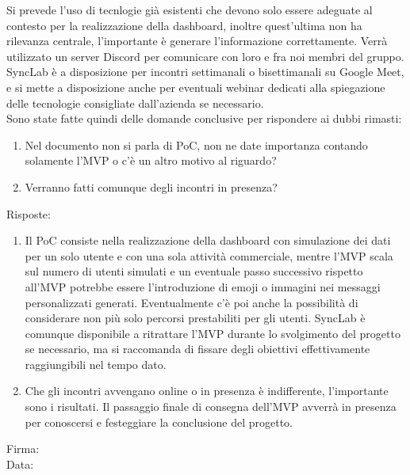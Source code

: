 \documentclass[12pt]{article}
\begin{document}
Si prevede l'uso di tecnlogie già esistenti che devono solo essere adeguate al contesto per la realizzazione della dashboard, inoltre quest'ultima non ha rilevanza centrale, l'importante è generare l'informazione correttamente.\newline
Verrà utilizzato un server Discord per comunicare con loro e fra noi membri del gruppo.\newline 
SyncLab è a disposizione per incontri settimanali o bisettimanali su Google Meet, e si mette a disposizione anche per eventuali webinar dedicati alla spiegazione delle tecnologie consigliate dall'azienda se necessario.\\
\vspace{2mm}
Sono state fatte quindi delle domande conclusive per rispondere ai dubbi rimasti:
\begin{enumerate}
\item Nel documento non si parla di PoC, non ne date importanza contando solamente l’MVP o c’è un altro motivo al riguardo?
\item Verranno fatti comunque degli incontri in presenza?
\end{enumerate}

Risposte:
\begin{enumerate}
\item Il PoC consiste nella realizzazione della dashboard con simulazione dei dati per un solo utente e con una sola attività commerciale, mentre l'MVP scala sul numero di utenti simulati e un eventuale passo successivo rispetto all'MVP potrebbe essere l'introduzione di emoji o immagini nei messaggi personalizzati generati. Eventualmente c'è poi anche la possibilità di considerare non più solo percorsi prestabiliti per gli utenti.
SyncLab è comunque disponibile a ritrattare l'MVP durante lo svolgimento del progetto se necessario, ma si raccomanda di fissare degli obiettivi effettivamente raggiungibili nel tempo dato.
\item Che gli incontri avvengano online o in presenza è indifferente, l'importante sono i risultati. Il passaggio finale di consegna dell'MVP avverrà in presenza per conoscersi e festeggiare la conclusione del progetto.
\end{enumerate}

\vfill
\begin{minipage}{10cm}
Firma: \hrulefill \\
\vspace{2mm}
Data: \dotfill
\end{minipage}
\end{document}
